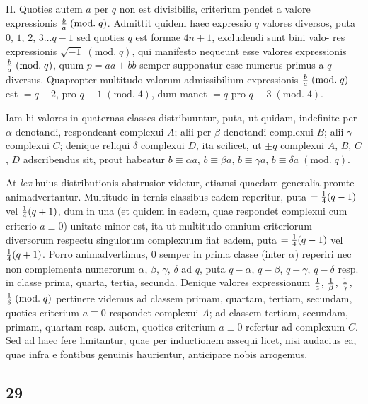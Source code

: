 \documentclass[twoside,12pt, showframe]{memoir}
\renewcommand{\pmod}[1]{\;(\textrm{mod.}\;#1)}
\let\oldfrac\frac
\def\frac#1#2{\mathchoice{\tfrac{#1}{#2}}{\oldfrac{#1}{#2}}{\genfrac{}{}{}{2}{#1}{#2\mathstrut}}{\genfrac{}{}{}{3}{#1}{#2\mathstrut}}}
\begin{document}
II. Quoties autem \(a\) per \(q\) non est divisibilis, criterium pendet a valore expressionis \(\frac{b}{a}\pmod{q}\). Admittit quidem haec expressio \(q\) valores diversos, puta \(0\), \(1\), \(2\), \(3 \ldots q-1\) sed quoties \(q\) est formae \(4 n+1\), excludendi sunt bini valo-\clearpage\noindent%
res expressionis \(\surd{-1}\pmod{q}\), qui manifesto nequeunt esse valores expressionis \(\frac{b}{a}\pmod{q}\), quum \(p=a a+b b\) semper supponatur esse numerus primus a \(q\) diversus. Quapropter multitudo valorum admissibilium expressionis \(\frac{b}{a}\pmod{q}\) est \(=q-2\), pro \(q \equiv 1\pmod{4}\), dum manet \(=q\) pro \(q \equiv 3\pmod{4}\).

Iam hi valores in quaternas classes distribuuntur, puta, ut quidam, indefinite per \(\alpha\) denotandi, respondeant complexui \(A\); alii per \(\beta\) denotandi complexui \(B\); alii \(\gamma\) complexui \(C\); denique reliqui \(\delta\) complexui \(D\), ita scilicet, ut \(\pm q\) complexui \(A\), \(B\), \(C\), \(D\) adscribendus sit, prout habeatur \(b \equiv \alpha a\), \(b \equiv \beta a\), \(b \equiv \gamma a\), \(b \equiv \delta a\pmod{q}\).

At \textit{lex} huius distributionis abstrusior videtur, etiamsi quaedam generalia promte animadvertantur. Multitudo in ternis classibus eadem reperitur, puta \(=\frac{1}{4}(q-1)\) vel \(\frac{1}{4}(q+1)\), dum in una (et quidem in eadem, quae respondet complexui cum criterio \(a \equiv 0\)) unitate minor est, ita ut multitudo omnium criteriorum diversorum respectu singulorum complexuum fiat eadem, puta \(=\frac{1}{4}(q-1)\) vel \(\frac{1}{4}(q+1)\). Porro animadvertimus, \(0\) semper in prima classe (inter \(\alpha\)) reperiri nec non complementa numerorum \(\alpha\), \(\beta\), \(\gamma\), \(\delta\) ad \(q\), puta \(q-\alpha\), \(q-\beta\), \(q-\gamma\), \(q-\delta\) resp. in classe prima, quarta, tertia, secunda. Denique valores expressionum \(\frac{1}{a}\), \(\frac{1}{\beta}\), \(\frac{1}{\gamma}\), \(\frac{1}{\delta} \pmod{q}\) pertinere videmus ad classem primam, quartam, tertiam, secundam, quoties criterium \(a \equiv 0\) respondet complexui \(A\); ad classem tertiam, secundam, primam, quartam resp. autem, quoties criterium \(a \equiv 0\) refertur ad complexum \(C\). Sed ad haec fere limitantur, quae per inductionem assequi licet, nisi audacius ea, quae infra e fontibus genuinis haurientur, anticipare nobis arrogemus.

\subsection*{29}
 
\end{document}
